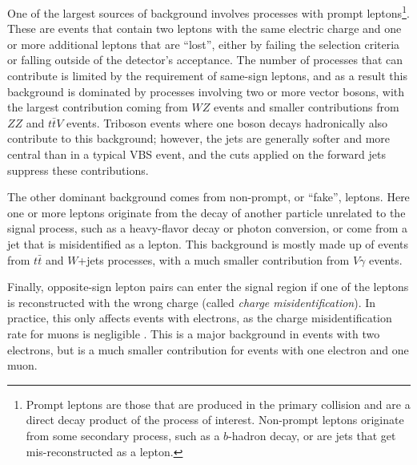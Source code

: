 One of the largest sources of background involves processes with prompt leptons\footnote{Prompt leptons are those that are produced in the primary collision and are a direct decay product of the process of interest.  Non-prompt leptons originate from some secondary process, such as a $b$-hadron decay, or are jets that get mis-reconstructed as a lepton.}.
These are events that contain two leptons with the same electric charge and one or more additional leptons that are ``lost'', either by failing the selection criteria or falling outside of the detector's acceptance.
The number of processes that can contribute is limited by the requirement of same-sign leptons, and as a result this background is dominated by processes involving two or more vector bosons, with the largest contribution coming from $WZ$ events and smaller contributions from $ZZ$ and $t\bar{t}V$ events.
Triboson events where one boson decays hadronically also contribute to this background; however, the jets are generally softer and more central than in a typical VBS event, and the cuts applied on the forward jets suppress these contributions.

The other dominant background comes from non-prompt, or ``fake'', leptons.
Here one or more leptons originate from the decay of another particle unrelated to the signal process, such as a heavy-flavor decay or photon conversion, or come from a jet that is misidentified as a lepton.
This background is mostly made up of events from $t\bar{t}$ and $W$+jets processes, with a much smaller contribution from $V\gamma$ events. 

Finally, opposite-sign lepton pairs can enter the signal region if one of the leptons is reconstructed with the wrong charge (called \emph{charge misidentification}).
In practice, this only affects events with electrons, as the charge misidentification rate for muons is negligible .
This is a major background in events with two electrons, but is a much smaller contribution for events with one electron and one muon.

%
